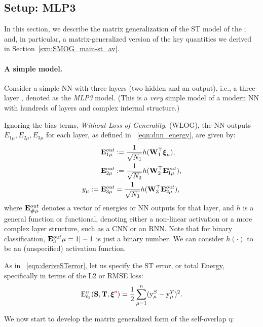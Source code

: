 \subsection{\MultiLayer Setup: MLP3}
\label{sxn:matgen_mlp3}

In this section, we describe the matrix generalization of the ST  model of the \LinearPerceptron; and, 
in particular, a matrix-generalized version of the key quantities we derived in Section~\ref{sxn:SMOG_main-st_av}.

\paragraph{A simple model.}

Consider a simple NN with three layers (two hidden and an output), i.e., a three-layer \MultiLayerPerceptron, denoted as the \emph{MLP3} model.
(This is a \emph{very} simple model of a modern NN with hundreds of layers and complex internal structure.)

Ignoring the bias terms, \emph{Without Loss of Generality}, (WLOG), the NN outputs
 $E_{1\mu},E_{2\mu},E_{3\mu}$ for each layer, as defined in \EQN~\ref{eqn:dnn_energy}, are given by:
\begin{align}
\nonumber
  \mathbf{E}^{out}_{1\mu} &:= \frac{1}{\sqrt{N_1}} h ({\mathbf{W}}_1^\top \boldsymbol{\xi}_{\mu}) , \\
\nonumber
  \mathbf{E}^{out}_{2\mu} &:= \frac{1}{\sqrt{N_2}} h ({\mathbf{W}}_2^\top \mathbf{E}^{out}_{1\mu})     , \\
\label{eqn:nflow}
             y_{\mu} := \mathbf{E}^{out}_{3\mu} &= \frac{1}{\sqrt{N_3}} h ({\mathbf{W}}_{3}^\top \mathbf{E}^{out}_{2\mu})     ,
\end{align}
where $\mathbf{E}^{out}_{\#\mu}$ denotes a vector of energies or NN outputs for that layer, and $h$ is a general function or functional, denoting either a non-linear activation or a more complex layer structure, such as a CNN or an RNN. Note that for binary classification, $\mathbf{E}^{out}_3{\mu}=1|-1$ is just a binary number.
We can consider $h(\cdot)$ to be an (unspecified) activation function.

As in \EQN~\ref{eqn:deriveSTerror}, let us specify the ST error, or total Energy, specifically in terms of the L2 or RMSE loss:
\begin{equation}
\label{eqn:DE}
\mathbf{\mathrm{E}}^{n}_{\ell_2}({\mathbf{S}},{\mathbf{T}}, \boldsymbol{\xi}^{{\color{red}\sf{n}}}) = \frac{1}{2}\sum_{\mu=1}^{n} (\mathrm{y}_{\mu}^{S} - \mathrm{y}_{\mu}^{T})^2.
\end{equation}

We now start to develop the matrix generalized form of the self-overlap \(\eta\):

